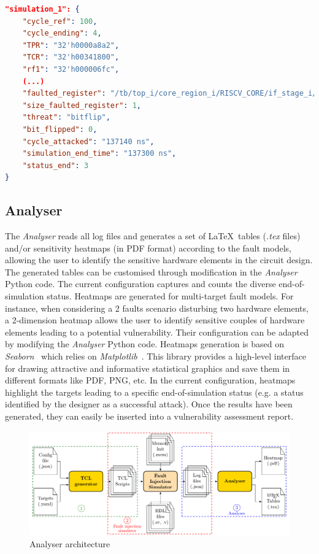 \begin{lstlisting}[style=topPosition, language=json, label=code:logJSONFile_fissa, caption=Extract of an example of a FISSA output log JSON file]
"simulation_1": {
    "cycle_ref": 100,
    "cycle_ending": 4,
    "TPR": "32'h0000a8a2",
    "TCR": "32'h00341800",
    "rf1": "32'h000006fc",
    (...)
    "faulted_register": "/tb/top_i/core_region_i/RISCV_CORE/if_stage_i/pc_id_o_tag",
    "size_faulted_register": 1,
    "threat": "bitflip",
    "bit_flipped": 0,
    "cycle_attacked": "137140 ns",
    "simulation_end_time": "137300 ns",
    "status_end": 3
}\end{lstlisting}

\subsection{Analyser}
\label{subsec:analyser}

The \textit{Analyser} reads all log files and generates a set of \LaTeX~tables (\textit{.tex} files) and/or sensitivity heatmaps (in PDF format) according to the fault models, allowing the user to identify the sensitive hardware elements in the circuit design. 
The generated tables can be customised through modification in the \textit{Analyser} Python code.
The current configuration captures and counts the diverse end-of-simulation status.
Heatmaps are generated for multi-target fault models. For instance, when considering a 2 faults scenario disturbing two hardware elements, a 2-dimension heatmap allows the user to identify sensitive couples of hardware elements leading to a potential vulnerability.
Their configuration can be adapted by modifying the \textit{Analyser} Python code. Heatmaps generation is based on \textit{Seaborn}~\cite{seaborn} which relies on \textit{Matplotlib}~\cite{matplotlib}. This library provides a high-level interface for drawing attractive and informative statistical graphics and save them in different formats like PDF, PNG, etc.
In the current configuration, heatmaps highlight the targets leading to a specific end-of-simulation status (e.g. a status identified by the designer as a successful attack).
Once the results have been generated, they can easily be inserted into a vulnerability assessment report. 

\begin{figure}[ht]
    \centering
    \includegraphics[width=.5\textwidth, page=5]{c4_fissa/img/fissa/archi_fissa.pdf}
    \caption{Analyser architecture}
    \label{fig:archi_analyser}
\end{figure}


